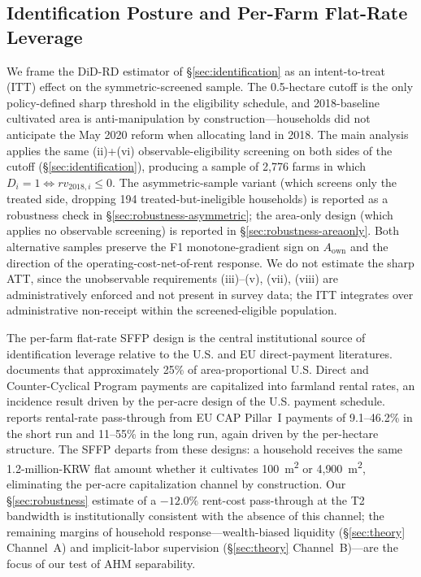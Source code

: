 \documentclass[12pt, a4paper]{article}
\begin{document}
\subsection{Identification Posture and Per-Farm Flat-Rate Leverage}
\label{sec:institutional-identification}

We frame the DiD-RD estimator of \S\ref{sec:identification} as an intent-to-treat (ITT) effect on the symmetric-screened sample. The 0.5-hectare cutoff is the only policy-defined sharp threshold in the eligibility schedule, and 2018-baseline cultivated area is anti-manipulation by construction---households did not anticipate the May 2020 reform when allocating land in 2018. The main analysis applies the same (ii)+(vi) observable-eligibility screening on both sides of the cutoff (\S\ref{sec:identification}), producing a sample of 2{,}776 farms in which $D_i = 1 \iff rv_{2018,i} \le 0$. The asymmetric-sample variant (which screens only the treated side, dropping 194 treated-but-ineligible households) is reported as a robustness check in \S\ref{sec:robustness-asymmetric}; the area-only design (which applies no observable screening) is reported in \S\ref{sec:robustness-areaonly}. Both alternative samples preserve the F1 monotone-gradient sign on $A_{\text{own}}$ and the direction of the operating-cost-net-of-rent response. We do not estimate the sharp ATT, since the unobservable requirements (iii)--(v), (vii), (viii) are administratively enforced and not present in survey data; the ITT integrates over administrative non-receipt within the screened-eligible population.

The per-farm flat-rate SFFP design is the central institutional source of identification leverage relative to the U.S. and EU direct-payment literatures. \citet{Kirwan2009_rentcap} documents that approximately 25\% of area-proportional U.S. Direct and Counter-Cyclical Program payments are capitalized into farmland rental rates, an incidence result driven by the per-acre design of the U.S. payment schedule. \citet{BaldoniCiaian2023_eucap} reports rental-rate pass-through from EU CAP Pillar~I payments of 9.1--46.2\% in the short run and 11--55\% in the long run, again driven by the per-hectare structure. The SFFP departs from these designs: a household receives the same 1.2-million-KRW flat amount whether it cultivates 100~m\textsuperscript{2} or 4{,}900~m\textsuperscript{2}, eliminating the per-acre capitalization channel by construction. Our \S\ref{sec:robustness} estimate of a $-12.0\%$ rent-cost pass-through at the T2 bandwidth is institutionally consistent with the absence of this channel; the remaining margins of household response---wealth-biased liquidity (\S\ref{sec:theory} Channel~A) and implicit-labor supervision (\S\ref{sec:theory} Channel~B)---are the focus of our test of AHM separability.
\end{document}
